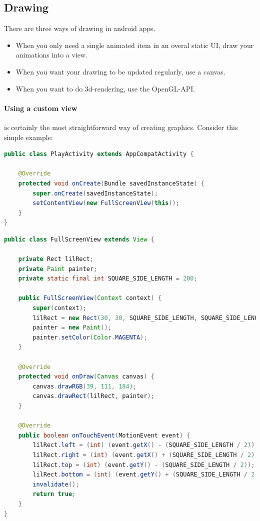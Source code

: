 \subsection{Drawing}
There are three ways of drawing in android apps. 
\begin{itemize}
    \item When you only need a single animated item in an overal static UI, draw your animations into a view.
    \item When you want your drawing to be updated regularly, use a canvas. 
    \item When you want to do 3d-rendering, use the OpenGL-API.
\end{itemize}


\paragraph{Using a custom view} is certainly the most straightforward way of creating graphics. Consider this simple example: 

\begin{lstlisting}[language=java]
public class PlayActivity extends AppCompatActivity {

    @Override
    protected void onCreate(Bundle savedInstanceState) {
        super.onCreate(savedInstanceState);
        setContentView(new FullScreenView(this));
    }
}
\end{lstlisting}

\begin{lstlisting}[language=java]
public class FullScreenView extends View {

    private Rect lilRect;
    private Paint painter;
    private static final int SQUARE_SIDE_LENGTH = 200;

    public FullScreenView(Context context) {
        super(context);
        lilRect = new Rect(30, 30, SQUARE_SIDE_LENGTH, SQUARE_SIDE_LENGTH);
        painter = new Paint();
        painter.setColor(Color.MAGENTA);
    }

    @Override
    protected void onDraw(Canvas canvas) {
        canvas.drawRGB(39, 111, 184);
        canvas.drawRect(lilRect, painter);
    }

    @Override
    public boolean onTouchEvent(MotionEvent event) {
        lilRect.left = (int) (event.getX() - (SQUARE_SIDE_LENGTH / 2));
        lilRect.right = (int) (event.getX() + (SQUARE_SIDE_LENGTH / 2));
        lilRect.top = (int) (event.getY() - (SQUARE_SIDE_LENGTH / 2));
        lilRect.bottom = (int) (event.getY() + (SQUARE_SIDE_LENGTH / 2));
        invalidate();
        return true;
    }
}
\end{lstlisting}


